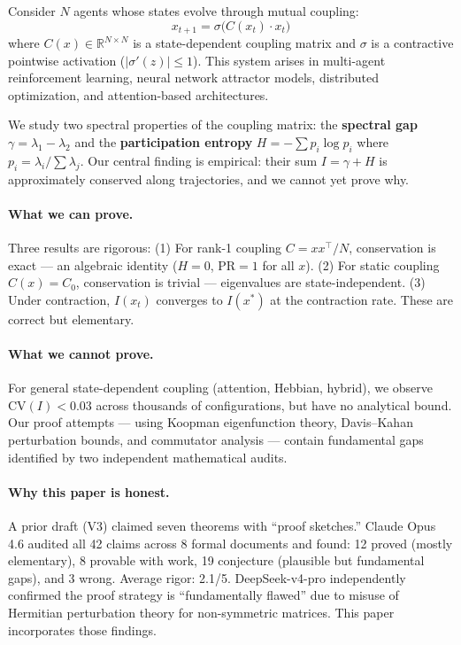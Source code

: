 \documentclass[11pt]{article}
\begin{document}
Consider $N$ agents whose states evolve through mutual coupling:
\begin{equation}
  x_{t+1} = \sigma\bigl(C(x_t) \cdot x_t\bigr)
\end{equation}
where $C(x) \in \mathbb{R}^{N \times N}$ is a state-dependent coupling matrix and $\sigma$ is a contractive pointwise activation ($|\sigma'(z)| \leq 1$). This system arises in multi-agent reinforcement learning, neural network attractor models, distributed optimization, and attention-based architectures.

We study two spectral properties of the coupling matrix: the \textbf{spectral gap} $\gamma = \lambda_1 - \lambda_2$ and the \textbf{participation entropy} $H = -\sum p_i \log p_i$ where $p_i = \lambda_i / \sum \lambda_j$. Our central finding is empirical: their sum $I = \gamma + H$ is approximately conserved along trajectories, and we cannot yet prove why.

\paragraph{What we can prove.}
Three results are rigorous: (1) For rank-1 coupling $C = xx^\top/N$, conservation is exact --- an algebraic identity ($H = 0$, $\mathrm{PR} = 1$ for all $x$). (2) For static coupling $C(x) = C_0$, conservation is trivial --- eigenvalues are state-independent. (3) Under contraction, $I(x_t)$ converges to $I(x^*)$ at the contraction rate. These are correct but elementary.

\paragraph{What we cannot prove.}
For general state-dependent coupling (attention, Hebbian, hybrid), we observe $\mathrm{CV}(I) < 0.03$ across thousands of configurations, but have no analytical bound. Our proof attempts --- using Koopman eigenfunction theory, Davis--Kahan perturbation bounds, and commutator analysis --- contain fundamental gaps identified by two independent mathematical audits.

\paragraph{Why this paper is honest.}
A prior draft (V3) claimed seven theorems with ``proof sketches.'' Claude Opus 4.6 audited all 42 claims across 8 formal documents and found: 12 proved (mostly elementary), 8 provable with work, 19 conjecture (plausible but fundamental gaps), and 3 wrong. Average rigor: 2.1/5. DeepSeek-v4-pro independently confirmed the proof strategy is ``fundamentally flawed'' due to misuse of Hermitian perturbation theory for non-symmetric matrices. This paper incorporates those findings.
\end{document}
